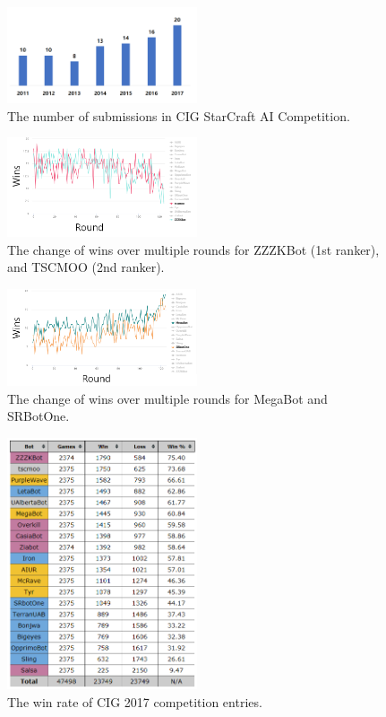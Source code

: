 \begin{figure}[h]
  \centering
  \includegraphics[width=0.5\textwidth]{fig/cig-num_of_submissions.png}
  \caption{The number of submissions in CIG StarCraft AI Competition.}
  \label{figureCIGsubmissions}
\end{figure} 


\begin{figure}[h]
  \centering
  \includegraphics[width=0.5\textwidth]{fig/cig-tscmoo-zzzkbot-winrate.png}
  \caption{The change of wins over multiple rounds for ZZZKBot (1st ranker), and TSCMOO (2nd ranker).}
  \label{figureCIGZZZTSCMOO}
\end{figure} 

\begin{figure}[h]
  \centering
  \includegraphics[width=0.5\textwidth]{fig/cig-megabot-srbotone.png}
  \caption{The change of wins over multiple rounds for MegaBot and SRBotOne.}
  \label{figureCIGZZZTSCMOO}
\end{figure} 

\begin{figure}[h]
  \centering
  \includegraphics[width=0.5\textwidth]{fig/cig2017.png}
  \caption{The win rate of CIG 2017 competition entries.}
  \label{figureCIG2017}
\end{figure} 

